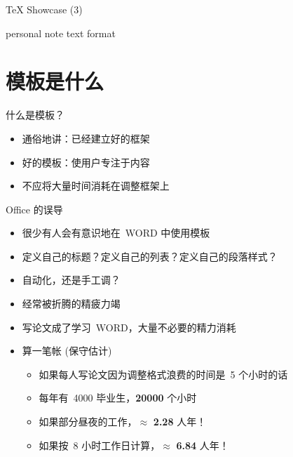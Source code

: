 \documentclass[dvipsnames, svgnames, mode=present, paper=screen, size=9pt,
style=husky]{powerdot}
\begin{document}
\begin{CJK*}{GBK}{song}
\begin{slide}{\TeX{} Showcase (3)}
\begin{minipage}[t]{0.5\linewidth}
\hspace{2cm}
\end{minipage}
\end{slide}
\begin{note}{personal note}
text format
\end{note}

\section{模板是什么}

\begin{slide}{什么是模板？}
  \begin{itemize}
  \item 通俗地讲：已经建立好的框架
  \item 好的模板：使用户专注于内容
  \item 不应将大量时间消耗在调整框架上
  \end{itemize}
  \end{slide}

\begin{slide}{Office 的误导}  
\begin{itemize}
\item 很少有人会有意识地在~WORD 中使用模板
\item 定义自己的标题？定义自己的列表？定义自己的段落样式？
\item 自动化，还是手工调？
\item 经常被折腾的精疲力竭
\item 写论文成了学习~WORD，大量不必要的精力消耗
\item 算一笔帐 (保守估计)
  \begin{itemize}
  \item 如果每人写论文因为调整格式浪费的时间是~5 个小时的话
  \item 每年有~4000 毕业生，\textbf{20000} 个小时
  \item 如果部分昼夜的工作，$\approx$ \textbf{2.28} 人年！
  \item 如果按~8 小时工作日计算，$\approx$ \textbf{6.84} 人年！
  \end{itemize}
\end{itemize}
\end{slide}


\end{CJK*}
\end{document}
